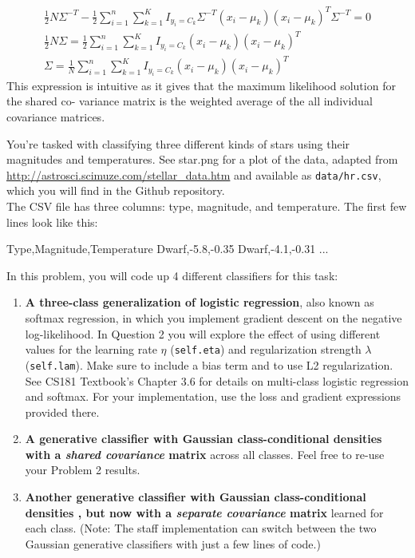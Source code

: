 \documentclass[submit]{harvardml}
\begin{document}
\begin{align*}
    \frac{1}{2}N\Sigma^{-T} - \frac{1}{2}\sum_{i=1}^n \sum_{k=1}^K I_{y_i=C_k} \Sigma^{-T}(x_i - \mu_k)(x_i - \mu_k)^T \Sigma^{-T} = 0 \\
    \frac{1}{2}N\Sigma = \frac{1}{2}\sum_{i=1}^n \sum_{k=1}^K I_{y_i=C_k}(x_i - \mu_k)(x_i - \mu_k)^T \\
    \Sigma = \frac{1}{N}\sum_{i=1}^n \sum_{k=1}^K I_{y_i=C_k}(x_i - \mu_k)(x_i - \mu_k)^T 
\end{align*}
This expression is intuitive as it gives that the maximum likelihood solution for the shared co- variance matrix is the weighted average of the all individual covariance matrices.

\begin{problem}

You're tasked with classifying three different kinds of stars using their magnitudes and temperatures. See star.png for a plot of
the data, adapted from
\url{http://astrosci.scimuze.com/stellar_data.htm} and available as
\verb|data/hr.csv|, which you will find in the Github repository. \\

The CSV file has three columns: type, magnitude, and temperature. The
first few lines look like this:
\begin{csv}
Type,Magnitude,Temperature
Dwarf,-5.8,-0.35
Dwarf,-4.1,-0.31
...
\end{csv}

In this problem, you will code up 4 different classifiers for this task:
\begin{enumerate}[label=\alph*)]

\item \textbf{A three-class generalization of logistic regression},
  also known as softmax regression, in which you implement gradient
  descent on the negative log-likelihood. In Question 2 you will
  explore the effect of using different values for the learning rate
  $\eta$ (\texttt{self.eta}) and regularization strength $\lambda$
  (\texttt{self.lam}).  Make sure to include a bias term and to use L2
  regularization. See CS181 Textbook's Chapter 3.6 for details on  multi-class logistic regression and softmax. For your implementation, use the loss and gradient expressions provided there.

\item \textbf{A generative classifier with Gaussian class-conditional
  densities with a \textit{shared covariance} matrix} across all classes. 
  Feel free to re-use your Problem 2 results.
\item \textbf{Another generative classifier with Gaussian class-conditional densities , but now 
with a \textit{separate covariance} matrix} learned for each class. (Note: 
The staff implementation can switch between the two Gaussian generative classifiers with just a
few lines of code.)


\end{enumerate}
\end{problem}
\end{document}

